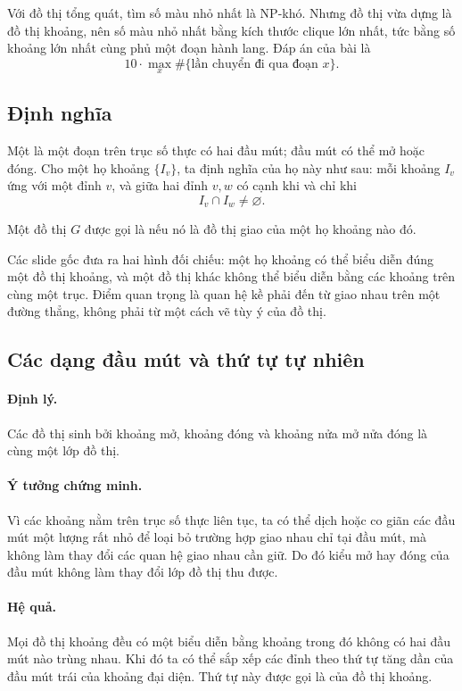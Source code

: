 \documentclass[11pt]{article}
\begin{document}
Với đồ thị tổng quát, tìm số màu nhỏ nhất là NP-khó. Nhưng đồ thị vừa dựng là
đồ thị khoảng, nên số màu nhỏ nhất bằng kích thước clique lớn nhất, tức bằng
số khoảng lớn nhất cùng phủ một đoạn hành lang. Đáp án của bài là
\[
  10\cdot \max_x \#\{\text{lần chuyển đi qua đoạn }x\}.
\]

\subsection{Định nghĩa}

Một  là một đoạn trên trục số thực có hai đầu mút; đầu mút có thể
mở hoặc đóng. Cho một họ khoảng $\{I_v\}$, ta định nghĩa 
của họ này như sau: mỗi khoảng $I_v$ ứng với một đỉnh $v$, và giữa hai đỉnh
$v,w$ có cạnh khi và chỉ khi
\[
  I_v\cap I_w\ne \varnothing.
\]

Một đồ thị $G$ được gọi là  nếu nó là đồ thị giao của một
họ khoảng nào đó.

Các slide gốc đưa ra hai hình đối chiếu: một họ khoảng có thể biểu diễn đúng
một đồ thị khoảng, và một đồ thị khác không thể biểu diễn bằng các khoảng trên
cùng một trục. Điểm quan trọng là quan hệ kề phải đến từ giao nhau trên một
đường thẳng, không phải từ một cách vẽ tùy ý của đồ thị.

\subsection{Các dạng đầu mút và thứ tự tự nhiên}

\paragraph{Định lý.}
Các đồ thị sinh bởi khoảng mở, khoảng đóng và khoảng nửa mở nửa đóng là cùng
một lớp đồ thị.

\paragraph{Ý tưởng chứng minh.}
Vì các khoảng nằm trên trục số thực liên tục, ta có thể dịch hoặc co giãn các
đầu mút một lượng rất nhỏ để loại bỏ trường hợp giao nhau chỉ tại đầu mút, mà
không làm thay đổi các quan hệ giao nhau cần giữ. Do đó kiểu mở hay đóng của
đầu mút không làm thay đổi lớp đồ thị thu được.

\paragraph{Hệ quả.}
Mọi đồ thị khoảng đều có một biểu diễn bằng khoảng trong đó không có hai đầu
mút nào trùng nhau. Khi đó ta có thể sắp xếp các đỉnh theo thứ tự tăng dần của
đầu mút trái của khoảng đại diện. Thứ tự này được gọi là 
của đồ thị khoảng.
\end{document}
